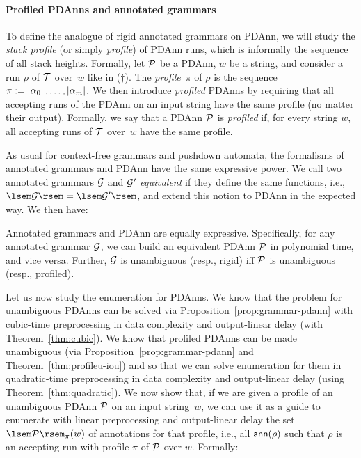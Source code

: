 %
%


\paragraph{Profiled PDAnns and annotated grammars} To define the analogue
of rigid annotated grammars on PDAnn, we will study the
\emph{stack profile} (or simply \emph{profile}) of PDAnn runs, which is
informally the sequence of all stack heights.
Formally, let $\mathcal{P}$ be a PDAnn, $w$ be a string, and consider a run $\rho$ of $\mathcal{T}$
over~$w$ like in ($\dagger$).
The \emph{profile}~$\pi$ of $\rho$ is the sequence $\pi:= \left|\alpha_0\right|, \ldots,
\left|\alpha_m\right|$.
We then introduce \emph{profiled} PDAnns by requiring that all
accepting runs of the PDAnn on an input string have the same profile (no matter
their output). Formally, we say that a PDAnn $\mathcal{P}$ is \emph{profiled} if, for every string $w$, all accepting runs of $\mathcal{T}$ over~$w$ have the same profile.

As usual for context-free grammars and pushdown automata, the formalisms of annotated grammars and PDAnn have the same expressive power.
We call two annotated grammars
$\mathcal{G}$ and $\mathcal{G}'$ \emph{equivalent} if they define the same functions, i.e.,
$\sem{\cG} = \sem{\cG'}$, and extend this notion to PDAnn in the expected way.
We then have:
%
\begin{proposition}\label{prop:grammar-pdann}
	Annotated grammars and PDAnn are equally expressive. Specifically, for any annotated grammar $\mathcal{G}$, we can build an equivalent PDAnn $\mathcal{P}$ in polynomial time, and vice versa.
	Further, $\mathcal{G}$ is unambiguous (resp., rigid) iff $\mathcal{P}$ is unambiguous (resp., profiled).
\end{proposition}

%
%
Let us now study the enumeration for PDAnns. We know that the problem
for unambiguous PDAnns can be solved via Proposition~\ref{prop:grammar-pdann}
with cubic-time preprocessing in data complexity and output-linear delay (with
Theorem~\ref{thm:cubic}). We know that
profiled PDAnns can be made unambiguous (via Proposition~\ref{prop:grammar-pdann} and Theorem~\ref{thm:profileu-iou}) and so that
%
we can solve enumeration for them in
quadratic-time preprocessing in data complexity and output-linear delay (using
Theorem~\ref{thm:quadratic}).
We now show that, if we are given a profile of an 
%
%
unambiguous PDAnn $\mathcal{P}$ on an input string~$w$, we can use it as a guide to enumerate with linear
preprocessing and output-linear delay the set $\sem{\cP}_{\pi}(w)$ of
annotations for that profile, i.e., all $\mathsf{ann}(\rho)$ such that $\rho$ is an
accepting run with profile $\pi$ of $\mathcal{P}$ over $w$. Formally:

